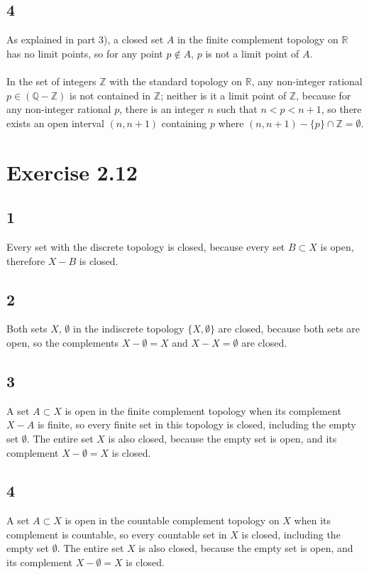 \documentclass{article}
\begin{document}
\subsection*{4}
As explained in part 3), a closed set $A$ in the finite complement topology on $\mathbb{R}$ has no limit points, 
so for any point $p \notin A$, $p$ is not a limit point of $A$.\\ 
\\ 
In the set of integers $\mathbb{Z}$ with the standard topology on $\mathbb{R}$, 
any non-integer rational $p \in (\mathbb{Q} - \mathbb{Z})$ is not contained 
in $\mathbb{Z}$; neither is it a limit point of $\mathbb{Z}$, because 
for any non-integer rational $p$, there is an integer $n$ such that 
$n < p < n+1$, so there exists an open interval $(n, n+1)$ containing $p$ 
where $(n, n+1) - \{p\} \cap \mathbb{Z} = \emptyset$.  


\section*{Exercise 2.12}
\subsection*{1}
Every set with the discrete topology is closed, because every set 
$B \subset X$ is open, therefore $X - B$ is closed.

\subsection*{2}
Both sets $X$, $\emptyset$ in the indiscrete topology $\{X, \emptyset \}$ are closed, 
because both sets are open, so the complements $X - \emptyset = X$ and 
$X - X = \emptyset$ are closed.  

\subsection*{3} 
A set $A \subset X$ is open in the finite complement topology when its complement $X - A$ 
is finite, so every finite set in this topology is closed, including the 
empty set $\emptyset$.  The entire set $X$ is also closed, because the 
empty set is open, and its complement $X - \emptyset = X$ is closed.

\subsection*{4}
A set $A \subset X$ is open in the countable complement topology on $X$ when its complement 
is countable, so every countable set in $X$ is closed, including the empty set 
$\emptyset$.  The entire set $X$ is also closed, because the empty set is open, 
and its complement $X - \emptyset = X$ is closed. 
\end{document}
